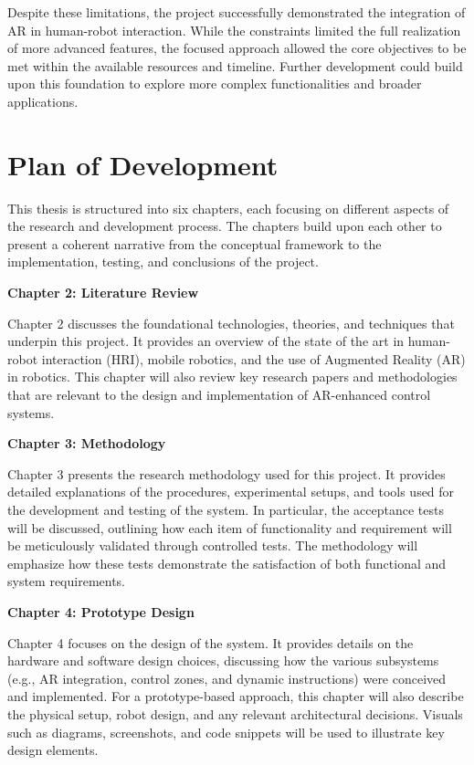 Despite these limitations, the project successfully demonstrated the integration of AR in human-robot interaction. While the constraints limited the full realization of more advanced features, the focused approach allowed the core objectives to be met within the available resources and timeline. Further development could build upon this foundation to explore more complex functionalities and broader applications.


\section{\label{sec:plan_of_development}Plan of Development}

This thesis is structured into six chapters, each focusing on different aspects of the research and development process. The chapters build upon each other to present a coherent narrative from the conceptual framework to the implementation, testing, and conclusions of the project.

\textbf{Chapter 2: Literature Review}

Chapter 2 discusses the foundational technologies, theories, and techniques that underpin this project. It provides an overview of the state of the art in human-robot interaction (HRI), mobile robotics, and the use of Augmented Reality (AR) in robotics. This chapter will also review key research papers and methodologies that are relevant to the design and implementation of AR-enhanced control systems.

\textbf{Chapter 3: Methodology}

Chapter 3 presents the research methodology used for this project. It provides detailed explanations of the procedures, experimental setups, and tools used for the development and testing of the system. In particular, the acceptance tests will be discussed, outlining how each item of functionality and requirement will be meticulously validated through controlled tests. The methodology will emphasize how these tests demonstrate the satisfaction of both functional and system requirements.

\textbf{Chapter 4: Prototype Design}

Chapter 4 focuses on the design of the system. It provides details on the hardware and software design choices, discussing how the various subsystems (e.g., AR integration, control zones, and dynamic instructions) were conceived and implemented. For a prototype-based approach, this chapter will also describe the physical setup, robot design, and any relevant architectural decisions. Visuals such as diagrams, screenshots, and code snippets will be used to illustrate key design elements.

